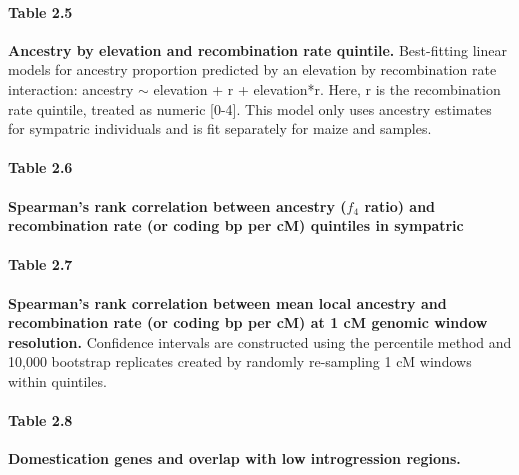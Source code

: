 \paragraph*{Table 2.5}
\label{tbl_elev_r_interaction_5}
{\bf Ancestry by elevation and recombination rate quintile.} Best-fitting linear models for ancestry proportion predicted by an elevation by recombination rate interaction: \mexicana ancestry $\sim$ elevation + r + elevation*r. Here, r is the recombination rate quintile, treated as numeric [0-4]. This model only uses ancestry estimates for sympatric individuals and is fit separately for maize and \mexicana samples.


\paragraph*{Table 2.6}
\label{spearmans_rho_f4_sympatric_mexicana_pop22}
{\bf Spearman's rank correlation between ancestry ($f_4$ ratio) and recombination rate (or coding bp per cM) quintiles in sympatric \mexicana}
{}

\paragraph*{Table 2.7}
\label{spearmans_rho_local_ancestry}
{\bf Spearman's rank correlation between mean \mexicana local ancestry and recombination rate (or coding bp per cM) at 1 cM genomic window resolution.} Confidence intervals are constructed using the percentile method and 10,000 bootstrap replicates created by randomly re-sampling 1 cM windows within quintiles.


\paragraph*{Table 2.8}
\label{genes_outliers}
{\bf Domestication genes and overlap with low introgression regions.}

\newpage
\newpage



